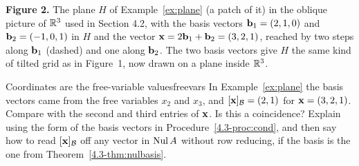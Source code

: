 \documentclass[11pt]{article}
\begin{document}
\textbf{Figure 2.} The plane $H$ of Example~\ref{ex:plane} (a patch of it) in the oblique picture of $\mathbb{R}^3$ used in Section 4.2, with the basis vectors $\mathbf{b}_1=(2,1,0)$ and $\mathbf{b}_2=(-1,0,1)$ in $H$ and the vector $\mathbf{x}=2\mathbf{b}_1+\mathbf{b}_2=(3,2,1)$, reached by two steps along $\mathbf{b}_1$ (dashed) and one along $\mathbf{b}_2$. The two basis vectors give $H$ the same kind of tilted grid as in Figure~1, now drawn on a plane inside $\mathbb{R}^3$.

\begin{think}{Coordinates are the free-variable values}{freevars}
In Example~\ref{ex:plane} the basis vectors came from the free variables $x_2$ and $x_3$, and $[\mathbf{x}]_{\mathcal{B}}=(2,1)$ for $\mathbf{x}=(3,2,1)$. Compare with the second and third entries of $\mathbf{x}$. Is this a coincidence? Explain using the form of the basis vectors in Procedure~\ref{4.3-proc:cond}, and then say how to read $[\mathbf{x}]_{\mathcal{B}}$ off any vector in $\operatorname{Nul} A$ without row reducing, if the basis is the one from Theorem~\ref{4.3-thm:nulbasis}.
\end{think}
\end{document}
